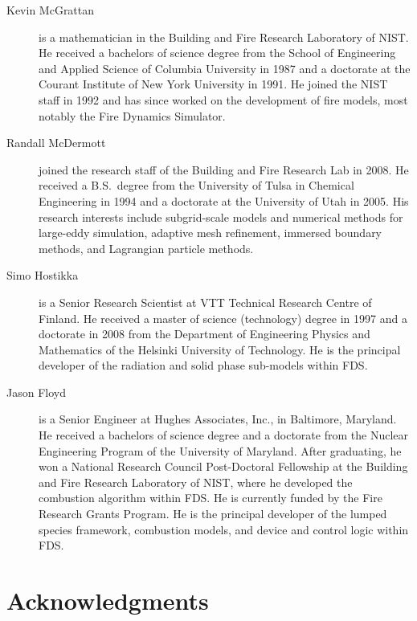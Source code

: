 \documentclass[11pt]{book}
\begin{document}
\begin{description}
\item[Kevin McGrattan] is a mathematician in the Building and Fire
Research Laboratory of NIST. He received a bachelors of science degree
from the School of Engineering and Applied Science of Columbia
University in 1987 and a doctorate at the Courant Institute of New
York University in 1991. He joined the NIST staff in 1992 and has
since worked on the development of fire models, most notably the Fire
Dynamics Simulator.
\item[Randall McDermott] joined the research staff of the Building and Fire Research Lab in 2008. He received a B.S.~degree from the University of Tulsa in
Chemical Engineering in 1994 and a doctorate at the University of Utah in 2005.
His research interests include subgrid-scale models and numerical methods for large-eddy simulation, adaptive mesh refinement,
immersed boundary methods, and Lagrangian particle methods.
\item[Simo Hostikka] is a Senior Research Scientist at VTT Technical
Research Centre of Finland. He received a master of science
(technology) degree in 1997 and a doctorate in 2008 from
the Department of Engineering Physics and Mathematics of the
Helsinki University of Technology.  He is the principal developer of the
radiation and solid phase sub-models within FDS.
\item[Jason Floyd] is a Senior Engineer at Hughes Associates, Inc., in
Baltimore, Maryland. He received a bachelors of science degree and a
doctorate from the Nuclear Engineering Program of the University of
Maryland. After graduating, he won a National Research Council
Post-Doctoral Fellowship at the Building and Fire Research Laboratory
of NIST, where he developed the combustion algorithm within FDS. He is
currently funded by the Fire Research Grants Program.  He is the principal developer
of the lumped species framework, combustion models, and device and control
logic within FDS.
\end{description}


\chapter{Acknowledgments}
\end{document}
